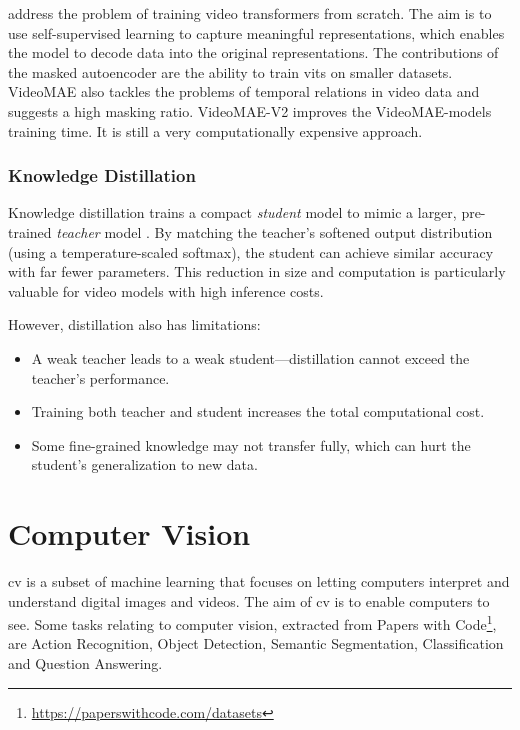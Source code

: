 \textcite{tong_videomae_2022} address the problem of training video transformers from scratch. The aim is to use self-supervised learning to capture meaningful representations, which enables the model to decode data into the original representations. The contributions of the masked autoencoder \cite{tong_videomae_2022} are the ability to train \acrshort{vit}s on smaller datasets. VideoMAE \cite{tong_videomae_2022} also tackles the problems of temporal relations in video data and suggests a high masking ratio. VideoMAE-V2 \cite{wang_videomae_2023} improves the VideoMAE-models training time. It is still a very computationally expensive approach. 


\subsubsection{Knowledge Distillation}
\label{sssec:knowledge_distillation}

Knowledge distillation trains a compact \emph{student} model to mimic a larger, pre-trained \emph{teacher} model \cite{denize_comedian_2024, li_videomamba_2024, bose_soccerkdnet_2023}. By matching the teacher's softened output distribution (using a temperature-scaled softmax), the student can achieve similar accuracy with far fewer parameters. This reduction in size and computation is particularly valuable for video models with high inference costs.

However, distillation also has limitations:
\begin{itemize}
    \item A weak teacher leads to a weak student—distillation cannot exceed the teacher's performance.
    \item Training both teacher and student increases the total computational cost.
    \item Some fine-grained knowledge may not transfer fully, which can hurt the student's generalization to new data.
\end{itemize}


\section{Computer Vision} 
\label{sec:computer_vision}

\acrfull{cv} is a subset of machine learning that focuses on letting computers interpret and understand digital images and videos. The aim of \acrlong{cv} is to enable computers to see. Some tasks relating to computer vision, extracted from Papers with Code\footnote{\url{https://paperswithcode.com/datasets}}, are Action Recognition, Object Detection, Semantic Segmentation, Classification and Question Answering. 

